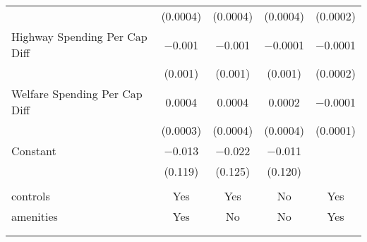 \begin{table}[!htbp]
\begin{tabular}{@{\extracolsep{5pt}}lcccc}
  & (0.0004) & (0.0004) & (0.0004) & (0.0002) \\ 
  Highway Spending Per Cap Diff & $-$0.001 & $-$0.001 & $-$0.0001 & $-$0.0001 \\ 
  & (0.001) & (0.001) & (0.001) & (0.0002) \\ 
  Welfare Spending Per Cap Diff & 0.0004 & 0.0004 & 0.0002 & $-$0.0001 \\ 
  & (0.0003) & (0.0004) & (0.0004) & (0.0001) \\ 
  Constant & $-$0.013 & $-$0.022 & $-$0.011 &  \\ 
  & (0.119) & (0.125) & (0.120) &  \\ 
 \hline \\[-1.8ex] 
controls & Yes & Yes & No & Yes \\ 
amenities & Yes & No & No & Yes \\ 
\hline \\[-1.8ex] 
\hline 
\hline \\[-1.8ex] 
\end{tabular} 
\end{table} 
